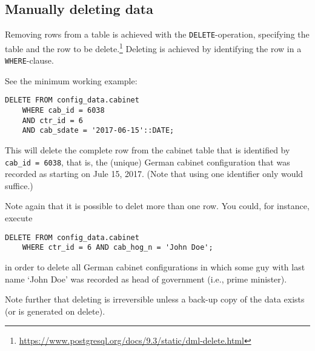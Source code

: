 \subsection{Manually deleting data}\label{subsec_manually_deleting_data}

Removing rows from a table is achieved with the \texttt{DELETE}-operation, specifying the table and the row to be delete.\footnote{\url{https://www.postgresql.org/docs/9.3/static/dml-delete.html}}
Deleting is achieved by identifying the row in a \texttt{WHERE}-clause. 

See the minimum working example:
\begin{lstlisting}[language=postgreSQL]
DELETE FROM config_data.cabinet 
	WHERE cab_id = 6038 
	AND ctr_id = 6 
	AND cab_sdate = '2017-06-15'::DATE;
\end{lstlisting}

This will delete the complete row from the cabinet table that is identified by \texttt{cab\_id = 6038}, that is, the (unique) German cabinet configuration that was recorded as starting on Jule 15, 2017. (Note that using one identifier only would suffice.)

Note again that it is possible to delet more than one row. 
You could, for instance, execute
\begin{lstlisting}[language=postgreSQL]
DELETE FROM config_data.cabinet 
	WHERE ctr_id = 6 AND cab_hog_n = 'John Doe';
\end{lstlisting}
in order to delete all German cabinet configurations in which some guy with last name `John Doe' was recorded as head of government (i.e., prime minister).

Note further that deleting is irreversible unless a back-up copy of the data exists (or is generated on delete).
